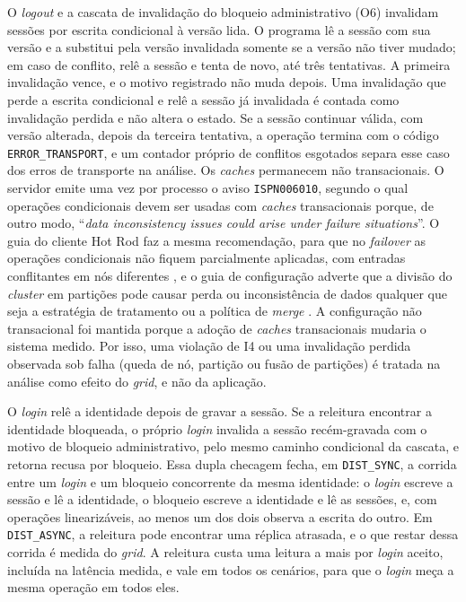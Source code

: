 O \emph{logout} e a cascata de invalidação do bloqueio administrativo (O6) invalidam sessões por escrita condicional à versão lida. O programa lê a sessão com sua versão e a substitui pela versão invalidada somente se a versão não tiver mudado; em caso de conflito, relê a sessão e tenta de novo, até três tentativas. A primeira invalidação vence, e o motivo registrado não muda depois. Uma invalidação que perde a escrita condicional e relê a sessão já invalidada é contada como invalidação perdida e não altera o estado. Se a sessão continuar válida, com versão alterada, depois da terceira tentativa, a operação termina com o código \texttt{ERROR\_TRANSPORT}, e um contador próprio de conflitos esgotados separa esse caso dos erros de transporte na análise. Os \emph{caches} permanecem não transacionais. O servidor emite uma vez por processo o aviso \texttt{ISPN006010}, segundo o qual operações condicionais devem ser usadas com \emph{caches} transacionais porque, de outro modo, ``\emph{data inconsistency issues could arise under failure situations}''. O guia do cliente Hot Rod faz a mesma recomendação, para que no \emph{failover} as operações condicionais não fiquem parcialmente aplicadas, com entradas conflitantes em nós diferentes \citep{infinispan_hotrod_java_15}, e o guia de configuração adverte que a divisão do \emph{cluster} em partições pode causar perda ou inconsistência de dados qualquer que seja a estratégia de tratamento ou a política de \emph{merge} \citep{infinispan_configuring_15}. A configuração não transacional foi mantida porque a adoção de \emph{caches} transacionais mudaria o sistema medido. Por isso, uma violação de I4 ou uma invalidação perdida observada sob falha (queda de nó, partição ou fusão de partições) é tratada na análise como efeito do \emph{grid}, e não da aplicação.

O \emph{login} relê a identidade depois de gravar a sessão. Se a releitura encontrar a identidade bloqueada, o próprio \emph{login} invalida a sessão recém-gravada com o motivo de bloqueio administrativo, pelo mesmo caminho condicional da cascata, e retorna recusa por bloqueio. Essa dupla checagem fecha, em \texttt{DIST\_SYNC}, a corrida entre um \emph{login} e um bloqueio concorrente da mesma identidade: o \emph{login} escreve a sessão e lê a identidade, o bloqueio escreve a identidade e lê as sessões, e, com operações linearizáveis, ao menos um dos dois observa a escrita do outro. Em \texttt{DIST\_ASYNC}, a releitura pode encontrar uma réplica atrasada, e o que restar dessa corrida é medida do \emph{grid}. A releitura custa uma leitura a mais por \emph{login} aceito, incluída na latência medida, e vale em todos os cenários, para que o \emph{login} meça a mesma operação em todos eles.

